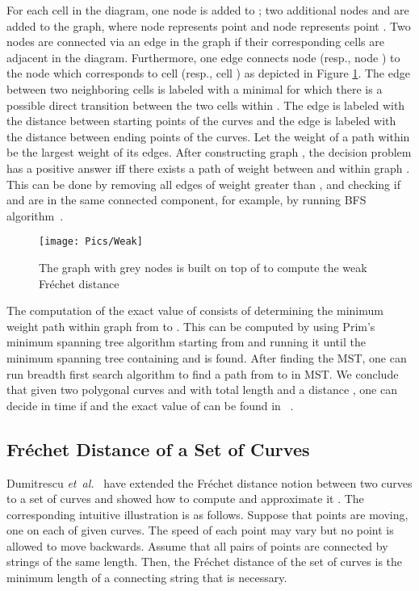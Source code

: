 \documentclass[12pt]{dalthesis}
\newcommand{\etal}{{\em et~al.\/}}
\newcommand{\Frechet}{Fr\'echet }
\begin{document}
For each cell in the diagram, one node is added to ; two additional nodes  and 
are added to the graph, where node  represents point 
and node  represents point .
Two nodes are connected via an edge in the graph 
if their corresponding cells are adjacent in the diagram.
Furthermore, one edge connects node  (resp., node )  
to the node which corresponds to cell  
(resp., cell ) as  depicted in Figure \ref{fig:weak}. 
The edge between two neighboring cells is labeled with a minimal 
for which there is a possible direct transition between the two cells within .
The edge  is labeled with the distance between starting points of the curves
and the edge   is labeled with the distance between ending points of the curves. 
Let the weight of a path within  be the largest weight of its edges. After constructing graph , the decision problem has a positive answer 
iff there exists a path of weight  between  and  within graph .
This can be done by removing all edges of weight greater than , 
and checking if  and  are in the same connected component, 
for example, by running BFS algorithm~\cite{AltG95}.



\begin{figure}[t]
	\centering
	\texttt{[image: Pics/Weak]}
	\caption{ The graph with grey nodes is built on top of  to compute the weak \Frechet distance}
	\label{fig:weak}
\end{figure}



The computation of the exact value of  consists of 
determining the minimum weight path within graph  from  to .
This can be computed by using Prim's minimum spanning tree 
algorithm starting from  and running it until the minimum spanning tree 
containing  and  is found. 
After finding 
the MST, one can run breadth first search algorithm to find 
a path from  to  in MST.  
We conclude that 
given two polygonal curves  and  with total length  and a distance ,
one can decide in  time if  and 
the exact value of  can be found in ~\cite{AltG95}. 









\subsection{\Frechet Distance of a Set of Curves}
Dumitrescu \etal~\cite{SetofCurves} have extended the \Frechet distance 
notion between two curves to a set of curves and showed how to compute and approximate it .
The corresponding intuitive illustration is as follows. 
Suppose that points are moving, one on each of	given curves. 
The speed of each point may vary but no point is allowed to move backwards. 
Assume that all pairs of points are connected by strings of the same length. 
Then, the \Frechet distance of the set of curves is the minimum length of a connecting string that is necessary.
\end{document}
